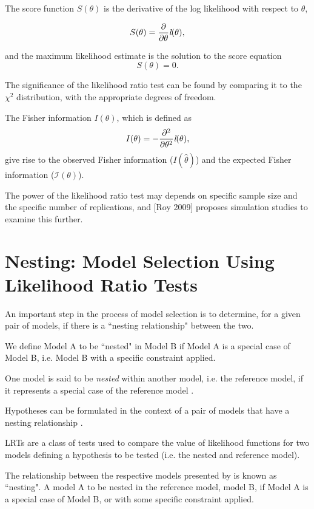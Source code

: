 \documentclass[12pt, a4paper]{report}
\theoremstyle{plain}
\theoremstyle{definition}
\theoremstyle{remark}
\begin{document}
The score function $S(\theta)$ is the derivative of the log likelihood with respect to $\theta$,

\[
S(\theta) = \frac{\partial}{\partial \theta}\emph{l}(\theta),
\]

and the maximum likelihood estimate is the solution to the score equation
\[
S(\theta) = 0.
\]

The significance of the likelihood ratio test can be found by comparing it to the  $\chi^2$ distribution, with the appropriate degrees of freedom.

The Fisher information $I(\theta)$, which is defined as
\[
I(\theta) = - \frac{\partial^2}{\partial \theta^2}\emph{l}(\theta),
\]
give rise to the observed Fisher information ($I(\hat{\theta})$) and the expected Fisher information ($\mathcal{I}(\theta)$).


The power of the likelihood ratio test may depends on specific sample size and the specific number of replications, and [Roy 2009] proposes simulation studies to examine this further.




\section{Nesting: Model Selection Using Likelihood Ratio Tests}
An important step in the process of model selection is to determine, for a given pair of models, if there is a ``nesting relationship" between the two.

We define Model A to be ``nested" in Model B if Model A is a special case of Model B, i.e. Model B with a specific constraint applied.

One model is said to be \emph{nested} within another model, i.e. the reference model, if it represents a special case of the reference model \citep{PB}.

Hypotheses can be formulated in the context of a pair of models that have a nesting relationship \citet{west}.

LRTs are a class of tests used to compare the value of likelihood functions for two models defining a hypothesis to be tested (i.e. the nested and reference model).

The relationship between the respective models presented by \citet{roy} is known as ``nesting".
A model A to be nested in the reference model, model B, if Model A is a special case of Model B, or with some specific constraint applied.


%
%
\end{document}
